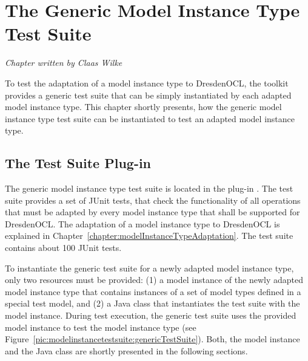 \chapter{The Generic Model Instance Type Test Suite}
\label{chapter:modelInstanceTestSuite}

\begin{flushright}
\textit{Chapter written by Claas Wilke}
\end{flushright}

To test the adaptation of a model instance type to DresdenOCL, the toolkit
provides a generic test suite that can be simply instantiated by each adapted 
model instance type. This chapter shortly presents, how the generic model
instance type test suite can be instantiated to test an adapted model 
instance type.



\section{The Test Suite Plug-in}

The generic model instance type test suite is located in the plug-in
.
The test suite provides a set of JUnit tests, that check the functionality of
all operations that must be adapted by every model instance type that
shall be supported for DresdenOCL. The adaptation of a model instance type
to DresdenOCL is explained in Chapter~\ref{chapter:modelInstanceTypeAdaptation}.  
The test suite contains about 100 JUnit tests.

To instantiate the generic test suite for a newly adapted model instance type,
only two resources must be provided: (1) a model instance of the newly adapted 
model instance type that contains instances of a set of model types defined in a
special test model, and (2) a Java class that instantiates the test suite with 
the model instance. During test execution, the generic test suite uses the
provided model instance to test the model instance type (see 
Figure~\ref{pic:modelinstancetestsuite:genericTestSuite}). Both, the model
instance and the Java class are shortly presented in the following sections.

